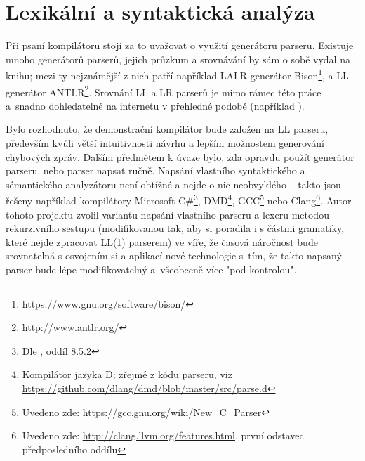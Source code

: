 \section{Lexikální a syntaktická analýza}
Při psaní kompilátoru stojí za to uvažovat o využití generátoru parseru. Existuje mnoho generátorů parserů, jejich průzkum a srovnávání by sám o sobě vydal na knihu; mezi ty nejznámější z nich patří například LALR generátor Bison\footnote{\url{https://www.gnu.org/software/bison/}}, a LL generátor ANTLR\footnote{\url{http://www.antlr.org/}}. Srovnání LL a LR parserů je mimo rámec této práce a~snadno dohledatelné na internetu v přehledné podobě (například \cite{LLLRComp}).

 Bylo rozhodnuto, že demonstrační kompilátor bude založen na LL parseru, především kvůli větší intuitivnosti návrhu a lepším možnostem generování chybových zpráv. Dalším předmětem k úvaze bylo, zda opravdu použít generátor parseru, nebo parser napsat ručně. Napsání vlastního syntaktického a sémantického analyzátoru není obtížné a nejde o nic neobvyklého -- takto jsou řešeny například kompilátory Microsoft C\#\footnote{Dle \cite{JavaCompilerConstructionCampbell}, oddíl 8.5.2}, DMD\footnote{Kompilátor jazyka D; zřejmé z kódu parseru, viz \url{https://github.com/dlang/dmd/blob/master/src/parse.d}}, GCC\footnote{Uvedeno zde: \url{https://gcc.gnu.org/wiki/New_C_Parser}} nebo Clang\footnote{Uvedeno zde: \url{http://clang.llvm.org/features.html}, první odstavec předposledního oddílu}. Autor tohoto projektu zvolil variantu napsání vlastního parseru a lexeru metodou rekurzivního sestupu (modifikovanou tak, aby si poradila i s částmi gramatiky, které nejde zpracovat LL(1) parserem) ve víře, že časová náročnost bude srovnatelná s osvojením si a aplikací nové technologie s~tím, že takto napsaný parser bude lépe modifikovatelný a~všeobecně více "pod kontrolou".

